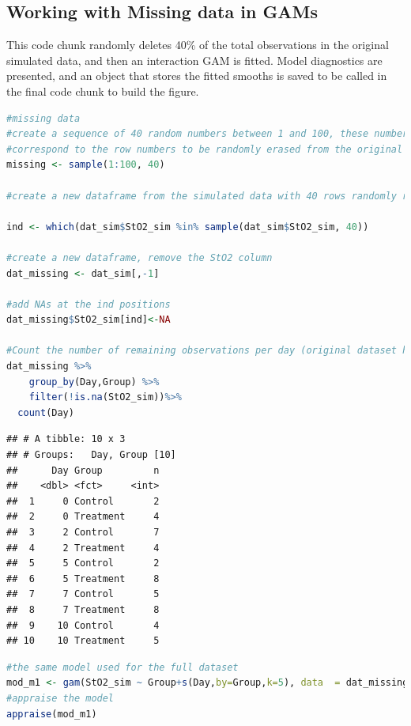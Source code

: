 \documentclass[
]{article}
\begin{document}
\hypertarget{working-with-missing-data-in-gams}{%
\subsection{Working with Missing data in GAMs}\label{working-with-missing-data-in-gams}}

This code chunk randomly deletes 40\% of the total observations in the original simulated data, and then an interaction GAM is fitted. Model diagnostics are presented, and an object that stores the fitted smooths is saved to be called in the final code chunk to build the figure.

\begin{lstlisting}[language=R]
#missing data
#create a sequence of 40 random numbers between 1 and 100, these numbers will
#correspond to the row numbers to be randomly erased from the original dataset
missing <- sample(1:100, 40)

#create a new dataframe from the simulated data with 40 rows randomly removed, keep the missing values as NA

ind <- which(dat_sim$StO2_sim %in% sample(dat_sim$StO2_sim, 40))

#create a new dataframe, remove the StO2 column
dat_missing <- dat_sim[,-1]

#add NAs at the ind positions
dat_missing$StO2_sim[ind]<-NA 

#Count the number of remaining observations per day (original dataset had 10 per group per day)
dat_missing %>%
    group_by(Day,Group) %>%
    filter(!is.na(StO2_sim))%>%
  count(Day)
\end{lstlisting}

\begin{lstlisting}
## # A tibble: 10 x 3
## # Groups:   Day, Group [10]
##      Day Group         n
##    <dbl> <fct>     <int>
##  1     0 Control       2
##  2     0 Treatment     4
##  3     2 Control       7
##  4     2 Treatment     4
##  5     5 Control       2
##  6     5 Treatment     8
##  7     7 Control       5
##  8     7 Treatment     8
##  9    10 Control       4
## 10    10 Treatment     5
\end{lstlisting}

\begin{lstlisting}[language=R]
#the same model used for the full dataset
mod_m1 <- gam(StO2_sim ~ Group+s(Day,by=Group,k=5), data  = dat_missing,family=scat)
#appraise the model
appraise(mod_m1)
\end{lstlisting}
\end{document}
